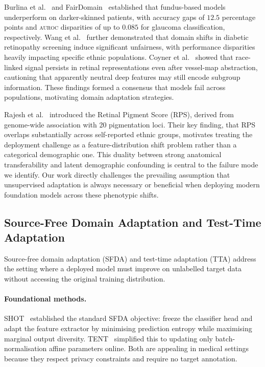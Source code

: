 \documentclass[11pt]{article}
\newcommand{\auroc}{\textsc{auroc}}
\begin{document}
Burlina et al.\  and FairDomain~\cite{fairDomain2024}
established that fundus-based models underperform on darker-skinned patients,
with accuracy gaps of $12.5$ percentage points and \auroc{} disparities of
up to $0.085$ for glaucoma classification, respectively. Wang et al.\  
further demonstrated that domain shifts in diabetic retinopathy screening induce 
significant unfairness, with performance disparities heavily impacting specific ethnic populations.
Coyner et al.\  showed that race-linked signal persists in retinal
representations even after vessel-map abstraction, cautioning that apparently
neutral deep features may still encode subgroup information. 
These findings formed a consensus that models fail across populations, motivating domain adaptation strategies.

Rajesh et al.\  introduced the Retinal Pigment Score
(RPS), derived from genome-wide association with 20 pigmentation loci. Their
key finding, that RPS overlaps substantially across self-reported ethnic
groups, motivates treating the deployment challenge as a
feature-distribution shift problem rather than a categorical demographic one.
This duality between strong anatomical transferability and latent demographic
confounding is central to the failure mode we identify. Our work directly challenges the prevailing assumption that unsupervised adaptation is always necessary or beneficial when deploying modern foundation models across these phenotypic shifts.

\subsection{Source-Free Domain Adaptation and Test-Time Adaptation}

Source-free domain adaptation (SFDA) and test-time adaptation (TTA)
address the setting where a deployed model must improve on unlabelled
target data without accessing the original training distribution.

\paragraph{Foundational methods.}
SHOT~\cite{liang2020} established the standard SFDA objective: freeze
the classifier head and adapt the feature extractor by minimising
prediction entropy while maximising marginal output diversity. TENT~\cite{wang2021tent} simplified this to updating only batch-normalisation
affine parameters online. Both are appealing in medical settings because
they respect privacy constraints and require no target annotation.
\end{document}
